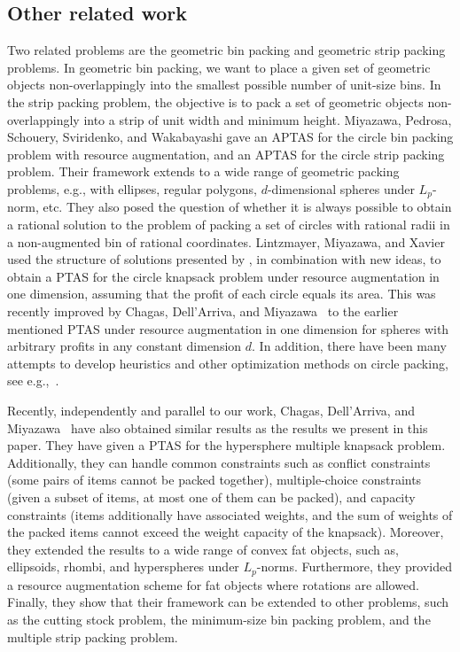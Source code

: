\documentclass[10pt,a4paper]{article}
\theoremstyle{plain}
\theoremstyle{plain}
\theoremstyle{plain}
\theoremstyle{definition}
\begin{document}
{\subsection{Other related work}
{Two related problems are the geometric bin packing and geometric strip packing problems.
In geometric bin packing, we want to place a given set of geometric objects non-overlappingly into the smallest possible number
of unit-size bins. 
In the strip packing problem, the objective is to pack a set of geometric objects non-overlappingly  into a strip of unit
width and minimum height.
Miyazawa, Pedrosa, Schouery, Sviridenko, and Wakabayashi \cite{MiyazawaPSSW16} gave an \textsf{APTAS} for the circle bin packing problem with resource augmentation, and
an \textsf{APTAS} for the circle strip packing problem. Their framework extends to a wide range of geometric packing problems, e.g., with ellipses, regular polygons, $d$-dimensional spheres under $L_p$-norm, etc.
They also posed the question of whether it is always possible to obtain a rational solution to the problem of packing a set of circles with rational radii in a non-augmented bin of rational coordinates. 
Lintzmayer, Miyazawa, and Xavier~\cite{lintzmayer2018two} used the structure of
solutions presented by \cite{MiyazawaPSSW16}, in combination with new ideas, to obtain a \textsf{PTAS} for the circle knapsack problem
under resource
augmentation in one dimension, assuming that the profit of each circle
equals its area. 
This was recently improved by Chagas, Dell\textquoteright Arriva, and Miyazawa~\cite{MiyazawaWAOA} to the earlier mentioned \textsf{PTAS} under resource augmentation in one dimension for spheres with arbitrary profits in any constant
dimension $d$. 
In addition, there have been many attempts to develop heuristics and
other optimization methods on circle packing, see e.g.,~\cite{szabo2007new,hifi2009literature,lubachevsky1997curved}.}

Recently, independently and parallel to our work, Chagas, Dell\textquoteright Arriva, and Miyazawa~\cite{ChagasNew} have also obtained similar results as the results we present in this paper. They have given a \textsf{PTAS} for the hypersphere multiple knapsack problem. Additionally, they can handle common constraints such as conflict constraints (some pairs of items cannot be packed together), multiple-choice constraints (given a subset of items, at most one of them can be packed), and capacity constraints (items additionally have associated weights, and the sum of weights of the packed items cannot exceed the weight capacity of the knapsack). Moreover, they extended the results to a wide range of convex fat objects, such as, ellipsoids, rhombi, and hyperspheres under $L_p$-norms. 
Furthermore, they provided a resource augmentation scheme for fat objects where rotations are allowed. Finally, they 
show that their framework can be extended to other problems, such as 
the cutting stock problem, the minimum-size bin packing problem, and the multiple strip packing problem.}
\end{document}
